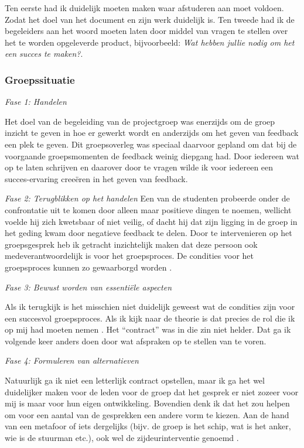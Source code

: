 Ten eerste had ik duidelijk moeten maken waar afstuderen aan moet voldoen. Zodat het doel van het document en zijn werk duidelijk is.
Ten tweede had ik de begeleiders aan het woord moeten laten door middel van vragen te stellen over het te worden opgeleverde product, bijvoorbeeld: \textit{Wat hebben jullie nodig om het een succes te maken?}. 

\subsubsection{Groepssituatie}
\emph{Fase 1: Handelen}

Het doel van de begeleiding van de projectgroep was enerzijds om de groep inzicht te geven in hoe er gewerkt wordt en anderzijds om het geven van feedback een plek te geven. Dit groepsoverleg was speciaal daarvoor gepland om dat bij de voorgaande groepsmomenten de feedback weinig diepgang had. Door iedereen wat op te laten schrijven en daarover door te vragen wilde ik voor iedereen een succes-ervaring creeëren in het geven van feedback.

\noindent \emph{Fase 2: Terugblikken op het handelen}
Een van de studenten probeerde onder de confrontatie uit te komen door alleen maar positieve dingen te noemen, wellicht voelde hij zich kwetsbaar of niet veilig, of dacht hij dat zijn ligging in de groep in het geding kwam door negatieve feedback te delen.
Door te intervenieren op het groepsgesprek heb ik getracht inzichtelijk maken dat deze persoon ook medeverantwoordelijk is voor het groepsproces. De condities voor het groepsproces kunnen zo gewaarborgd worden \cite{baert2009interventies}.

\noindent \emph{Fase 3: Bewust worden van essentiële aspecten}

Als ik terugkijk is het misschien niet duidelijk geweest wat de condities zijn voor een succesvol groepsproces. Als ik kijk naar de theorie is dat precies de rol die ik op mij had moeten nemen \cite{baert2009interventies}. Het ``contract'' was in die zin niet helder. Dat ga ik volgende keer anders doen door wat afspraken op te stellen van te voren.

\noindent \emph{Fase 4: Formuleren van alternatieven}

Natuurlijk ga ik niet een letterlijk contract opstellen, maar ik ga het wel duidelijker maken voor de leden voor de groep dat het gesprek er niet zozeer voor mij is maar voor hun eigen ontwikkeling. Bovendien denk ik dat het zou helpen om voor een aantal van de gesprekken een andere vorm te kiezen. Aan de hand van een metafoor of iets dergelijks (bijv. de groep is het schip, wat is het anker, wie is de stuurman etc.), ook wel de zijdeurinterventie genoemd \cite{remmerswaal2015zijdeurinterventies}.
